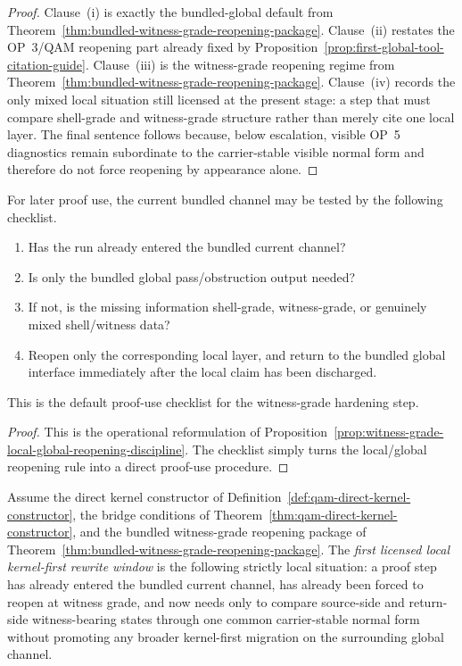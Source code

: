\begin{proof}
Clause~(i) is exactly the bundled-global default from Theorem~\ref{thm:bundled-witness-grade-reopening-package}. Clause~(ii) restates the OP~3/QAM reopening part already fixed by Proposition~\ref{prop:first-global-tool-citation-guide}. Clause~(iii) is the witness-grade reopening regime from Theorem~\ref{thm:bundled-witness-grade-reopening-package}. Clause~(iv) records the only mixed local situation still licensed at the present stage: a step that must compare shell-grade and witness-grade structure rather than merely cite one local layer. The final sentence follows because, below escalation, visible OP~5 diagnostics remain subordinate to the carrier-stable visible normal form and therefore do not force reopening by appearance alone.
\end{proof}

\begin{corollary}
\label{cor:witness-grade-reopening-checklist}
For later proof use, the current bundled channel may be tested by the following checklist.
\begin{enumerate}[leftmargin=2em,label=(\roman*)]
\item Has the run already entered the bundled current channel?
\item Is only the bundled global pass/obstruction output needed?
\item If not, is the missing information shell-grade, witness-grade, or genuinely mixed shell/witness data?
\item Reopen only the corresponding local layer, and return to the bundled global interface immediately after the local claim has been discharged.
\end{enumerate}
This is the default proof-use checklist for the  witness-grade hardening step.
\end{corollary}

\begin{proof}
This is the operational reformulation of Proposition~\ref{prop:witness-grade-local-global-reopening-discipline}. The checklist simply turns the local/global reopening rule into a direct proof-use procedure.
\end{proof}

\begin{definition}
\label{def:first-licensed-local-kernel-first-rewrite-window}
Assume the direct kernel constructor of Definition~\ref{def:qam-direct-kernel-constructor}, the bridge conditions of Theorem~\ref{thm:qam-direct-kernel-constructor}, and the bundled witness-grade reopening package of Theorem~\ref{thm:bundled-witness-grade-reopening-package}. The \emph{first licensed local kernel-first rewrite window} is the following strictly local situation: a proof step has already entered the bundled current channel, has already been forced to reopen at witness grade, and now needs only to compare source-side and return-side witness-bearing states through one common carrier-stable normal form without promoting any broader kernel-first migration on the surrounding global channel.
\end{definition}

